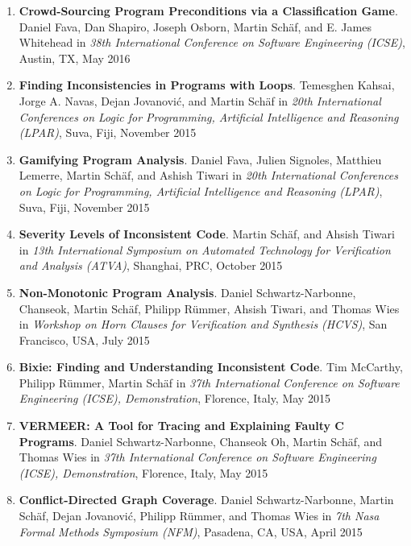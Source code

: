 \begin{enumerate}
\item \textbf{Crowd-Sourcing Program Preconditions via a Classification Game}.
\\ Daniel Fava, Dan Shapiro, Joseph Osborn, Martin Sch\"af, and E. James
Whitehead in \emph{38th International Conference on Software Engineering (ICSE)}, Austin,
TX, May 2016


\item \textbf{Finding Inconsistencies in Programs with Loops}.
Temesghen Kahsai, Jorge A. Navas, Dejan Jovanovi\'c, and Martin Sch\"af
in \emph{20th International Conferences on Logic for Programming, Artificial Intelligence and Reasoning (LPAR)}, Suva, Fiji, November
2015

\item \textbf{Gamifying Program Analysis}.
Daniel Fava, Julien Signoles, Matthieu Lemerre, Martin Sch\"af, and Ashish Tiwari
in \emph{20th International Conferences on Logic for Programming, Artificial Intelligence and Reasoning (LPAR)}, Suva, Fiji, November
2015

\item \textbf{Severity Levels of Inconsistent Code}.
Martin Sch\"af, and Ahsish Tiwari in \emph{13th International
Symposium on Automated Technology for Verification and Analysis (ATVA)},
Shanghai, PRC, October 2015

\item \textbf{Non-Monotonic Program Analysis}.
Daniel Schwartz-Narbonne, Chanseok, Martin Sch\"af, Philipp R\"ummer, Ahsish
Tiwari, and Thomas Wies in \emph{Workshop on Horn Clauses for Verification and
Synthesis (HCVS)}, San Francisco, USA, July 2015


\item \textbf{Bixie: Finding and Understanding Inconsistent Code}.
Tim McCarthy, Philipp R\"ummer, Martin Sch\"af 
in \emph{37th International Conference on Software Engineering (ICSE),
Demonstration}, Florence, Italy, May 2015


\item \textbf{VERMEER: A Tool for Tracing and Explaining Faulty C Programs}.
Daniel Schwartz-Narbonne, Chanseok Oh, Martin Sch\"af, and Thomas Wies 
in \emph{37th International Conference on Software Engineering (ICSE),
Demonstration}, Florence, Italy, May 2015


\item \textbf{Conflict-Directed Graph Coverage}.
Daniel Schwartz-Narbonne, Martin Sch\"af, Dejan Jovanovi\'c, Philipp R\"ummer,
and Thomas Wies in \emph{7th Nasa Formal
Methods Symposium (NFM)}, Pasadena, CA, USA, April 2015



\end{enumerate}
